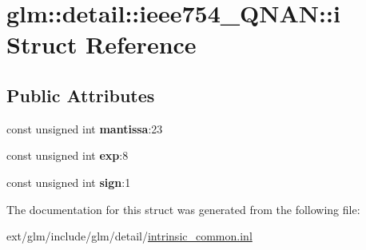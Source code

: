 \hypertarget{structglm_1_1detail_1_1ieee754___q_n_a_n_1_1i}{\section{glm\-:\-:detail\-:\-:ieee754\-\_\-\-Q\-N\-A\-N\-:\-:i Struct Reference}
\label{structglm_1_1detail_1_1ieee754___q_n_a_n_1_1i}
}
\subsection*{Public Attributes}
\begin{DoxyCompactItemize}
\item 
\hypertarget{structglm_1_1detail_1_1ieee754___q_n_a_n_1_1i_a1999926defcba631a716bee7d3044d0a}{const unsigned int {\bfseries mantissa}\-:23}\label{structglm_1_1detail_1_1ieee754___q_n_a_n_1_1i_a1999926defcba631a716bee7d3044d0a}

\item 
\hypertarget{structglm_1_1detail_1_1ieee754___q_n_a_n_1_1i_abc8cdb38ff3aa6a09214f7bfa32efac8}{const unsigned int {\bfseries exp}\-:8}\label{structglm_1_1detail_1_1ieee754___q_n_a_n_1_1i_abc8cdb38ff3aa6a09214f7bfa32efac8}

\item 
\hypertarget{structglm_1_1detail_1_1ieee754___q_n_a_n_1_1i_a5dd7e174864b6a8cd045563dde44f305}{const unsigned int {\bfseries sign}\-:1}\label{structglm_1_1detail_1_1ieee754___q_n_a_n_1_1i_a5dd7e174864b6a8cd045563dde44f305}

\end{DoxyCompactItemize}


The documentation for this struct was generated from the following file\-:\begin{DoxyCompactItemize}
\item 
ext/glm/include/glm/detail/\hyperlink{intrinsic__common_8inl}{intrinsic\-\_\-common.\-inl}\end{DoxyCompactItemize}
